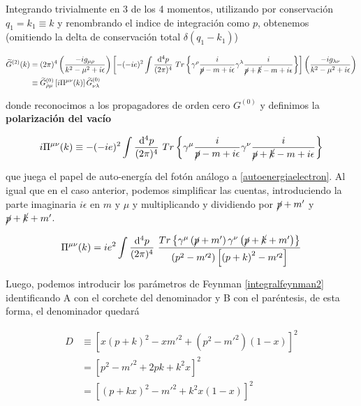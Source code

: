 \documentclass{article}
\numberwithin{equation}{section}
\begin{document}
Integrando trivialmente en 3 de los 4 momentos, utilizando por conservación $ q_1=k_1 \equiv k $ y renombrando el indice de integración como $ p $, obtenemos (omitiendo la delta de conservación total $ \delta(q_1-k_1) $)

\begin{equation}\label{key}
\begin{aligned}
\widetilde{G}^{(2)}(k)&=(2\pi)^{4} \left(\frac{-ig_{\mu \rho}}{k^2 - \mu^2 +i\epsilon}\right) \left[-(-ie)^{2} \int \frac{\mathrm{d^4}p}{(2\pi)^4} \ Tr\left\{ \gamma^{\rho} \frac{i}{\cancel{p} -m+i\epsilon} \gamma^{\lambda} \frac{i}{\cancel{p} + \cancel{k} -m +i\epsilon}   \right\} \right]  \left(\frac{-ig_{\lambda \nu}}{k^2 - \mu^2 +i\epsilon}\right)\\
&\equiv \widetilde{G}^{(0)}_{\rho\mu} \left[ i \Pi^{\mu\nu}(k)\right] \widetilde{G}^{(0)}_{\nu\lambda} 
\end{aligned}
\end{equation}

donde reconocimos a los propagadores de orden cero $ G^{(0)} $ y definimos la \textbf{polarización del vacío}

\begin{equation}\label{vacumpolarization}
i \Pi^{\mu\nu}(k) \equiv -(-ie)^{2} \int \frac{\mathrm{d^4}p}{(2\pi)^4} \ Tr\left\{ \gamma^{\mu} \frac{i}{\cancel{p} -m+i\epsilon} \gamma^{\nu} \frac{i}{\cancel{p} + \cancel{k} -m +i\epsilon}   \right\}
\end{equation}

que juega el papel de auto-energía del fotón análogo a \ref{autoenergiaelectron}. Al igual que en el caso anterior, podemos simplificar las cuentas, introduciendo la parte imaginaria $ i\epsilon $ en $ m $ y $ \mu $ y multiplicando y dividiendo por $ \cancel{p}+m' $ y $ \cancel{p}+\cancel{k}+m' $.

\begin{equation}\label{aux5}
\Pi^{\mu\nu}(k) = i e^2 \int \frac{\mathrm{d^4}p}{(2\pi)^4} \ \frac{Tr\left\{ \gamma^{\mu}\left(\cancel{p}+m'\right)\gamma^{\nu}\left(\cancel{p}+\cancel{k}+m'\right) \right\}}{\left(p^2 -m'^2\right)\left[\left(p+k\right)^2 -m'^2 \right]}   
\end{equation}

Luego, podemos introducir los parámetros de Feynman \ref{integralfeynman2} identificando A con el corchete del denominador y B con el paréntesis, de esta forma, el denominador quedará

\begin{equation}\label{key}
\begin{aligned}
D&\equiv \left[x\left(p+k\right)^2-xm'^2 + \left(p^2 - m'^2\right)(1-x)\right]^2\\
&=\left[p^2-m'^2 + 2pk + k^2x\right]^2\\
&=\left[\left(p+kx\right)^2 - m'^2 + k^2x(1-x)\right]^2
\end{aligned}
\end{equation}
\end{document}
